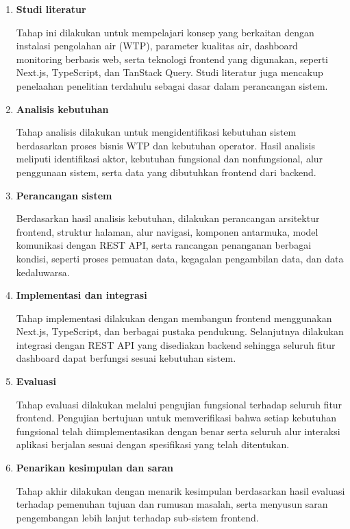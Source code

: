 \begin{enumerate}
    \item \textbf{Studi literatur}

    Tahap ini dilakukan untuk mempelajari konsep yang berkaitan dengan instalasi
    pengolahan air (WTP), parameter kualitas air, dashboard monitoring berbasis
    web, serta teknologi frontend yang digunakan, seperti Next.js, TypeScript,
    dan TanStack Query. Studi literatur juga mencakup penelaahan penelitian
    terdahulu sebagai dasar dalam perancangan sistem.

    \item \textbf{Analisis kebutuhan}

    Tahap analisis dilakukan untuk mengidentifikasi kebutuhan sistem berdasarkan
    proses bisnis WTP dan kebutuhan operator. Hasil analisis meliputi identifikasi
    aktor, kebutuhan fungsional dan nonfungsional, alur penggunaan sistem, serta
    data yang dibutuhkan frontend dari backend.

    \item \textbf{Perancangan sistem}

    Berdasarkan hasil analisis kebutuhan, dilakukan perancangan arsitektur
    frontend, struktur halaman, alur navigasi, komponen antarmuka, model
    komunikasi dengan REST API, serta rancangan penanganan berbagai kondisi,
    seperti proses pemuatan data, kegagalan pengambilan data, dan data
    kedaluwarsa.

    \item \textbf{Implementasi dan integrasi}

    Tahap implementasi dilakukan dengan membangun frontend menggunakan Next.js,
    TypeScript, dan berbagai pustaka pendukung. Selanjutnya dilakukan integrasi
    dengan REST API yang disediakan backend sehingga seluruh fitur dashboard dapat
    berfungsi sesuai kebutuhan sistem.

    \item \textbf{Evaluasi}

    Tahap evaluasi dilakukan melalui pengujian fungsional terhadap seluruh fitur
    frontend. Pengujian bertujuan untuk memverifikasi bahwa setiap kebutuhan
    fungsional telah diimplementasikan dengan benar serta seluruh alur interaksi
    aplikasi berjalan sesuai dengan spesifikasi yang telah ditentukan.

    \item \textbf{Penarikan kesimpulan dan saran}

    Tahap akhir dilakukan dengan menarik kesimpulan berdasarkan hasil evaluasi
    terhadap pemenuhan tujuan dan rumusan masalah, serta menyusun saran
    pengembangan lebih lanjut terhadap sub-sistem frontend.
\end{enumerate}

